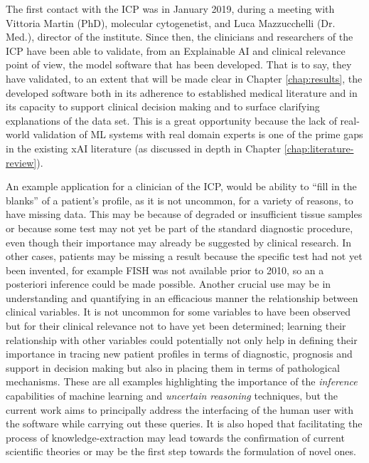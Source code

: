 The first contact with the ICP was in January 2019, during a meeting with Vittoria Martin (PhD), molecular cytogenetist, and Luca Mazzucchelli (Dr. Med.), director of the institute.
Since then, the clinicians and researchers of the ICP have been able to validate, from an Explainable AI and clinical relevance point of view, the model software that has been developed.
That is to say, they have validated, to an extent that will be made clear in Chapter \ref{chap:results}, the developed software both in its adherence to established medical literature and in its capacity to support clinical decision making and to surface clarifying explanations of the data set.
This is a great opportunity because the lack of real-world validation of ML systems with real domain experts is one of the prime gaps in the existing xAI literature (as discussed in depth in Chapter \ref{chap:literature-review}).

An example application for a clinician of the ICP, would be ability to \enquote{fill in the blanks} of a patient's profile, as it is not uncommon, for a variety of reasons, to have missing data.
This may be because of degraded or insufficient tissue samples or because some test may not yet be part of the standard diagnostic procedure, even though their importance may already be suggested by clinical research.
In other cases, patients may be missing a result because the specific test had not yet been invented, for example FISH was not available prior to 2010, so an a posteriori inference could be made possible.
Another crucial use may be in understanding and quantifying in an efficacious manner the relationship between clinical variables.
It is not uncommon for some variables to have been observed but for their clinical relevance not to have yet been determined; learning their relationship with other variables could potentially not only help in defining their importance in tracing new patient profiles in terms of diagnostic, prognosis and support in decision making but also in placing them in terms of pathological mechanisms.
These are all examples highlighting the importance of the \textit{inference} capabilities of machine learning and \textit{uncertain reasoning} techniques, but the current work aims to principally address the interfacing of the human user with the software while carrying out these queries.
It is also hoped that facilitating the process of knowledge-extraction may lead towards the confirmation of current scientific theories or may be the first step towards the formulation of novel ones.

